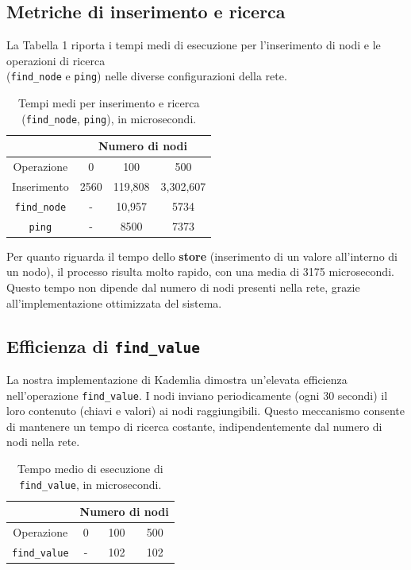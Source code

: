 \documentclass{article}
\begin{document}
\subsection{Metriche di inserimento e ricerca}
La Tabella 1 riporta i tempi medi di esecuzione per l'inserimento di nodi e le operazioni di ricerca \\(\texttt{find\_node} e \texttt{ping}) nelle diverse configurazioni della rete.
\begin{table}[htbp] 
    \centering 
    \begin{tabular}{|c|c|c|c|} 
    \hline
        & \multicolumn{3}{|c|}{Numero di nodi} \\
        \hline
        Operazione & 0  & 100  & 500  \\
        \hline
        Inserimento & 2560 & 119,808 & 3,302,607 \\ 
        \hline
        \texttt{find\_node} & - & 10,957 & 5734 \\ 
        \hline
        \texttt{ping} & - & 8500 & 7373 \\
        \hline 
    \end{tabular} 
    \caption{Tempi medi per inserimento e ricerca (\texttt{find\_node}, \texttt{ping}), in microsecondi.} 
    \label{tab:tempi medi} 
\end{table}
Per quanto riguarda il tempo dello \textbf{store} (inserimento di un valore all'interno di un nodo), il processo risulta molto rapido, con una media di 3175 microsecondi. Questo tempo non dipende dal numero di nodi presenti nella rete, grazie all'implementazione ottimizzata del sistema.
\subsection{Efficienza di \texttt{find\_value}}
La nostra implementazione di Kademlia dimostra un'elevata efficienza nell'operazione \texttt{find\_value}. I nodi inviano periodicamente (ogni 30 secondi) il loro contenuto (chiavi e valori) ai nodi raggiungibili. Questo meccanismo consente di mantenere un tempo di ricerca costante, indipendentemente dal numero di nodi nella rete.
\begin{table}[htbp] 
    \centering 
    \begin{tabular}{|c|c|c|c|} 
        \hline
        & \multicolumn{3}{|c|}{Numero di nodi} \\
        \hline 
        Operazione & 0 & 100 & 500 \\ 
        \hline 
        \texttt{find\_value} & - & 102 & 102 \\ 
        \hline 
    \end{tabular} 
    \caption{Tempo medio di esecuzione di \texttt{find\_value}, in microsecondi.} \label{tab:find_value} 
\end{table}
\end{document}
